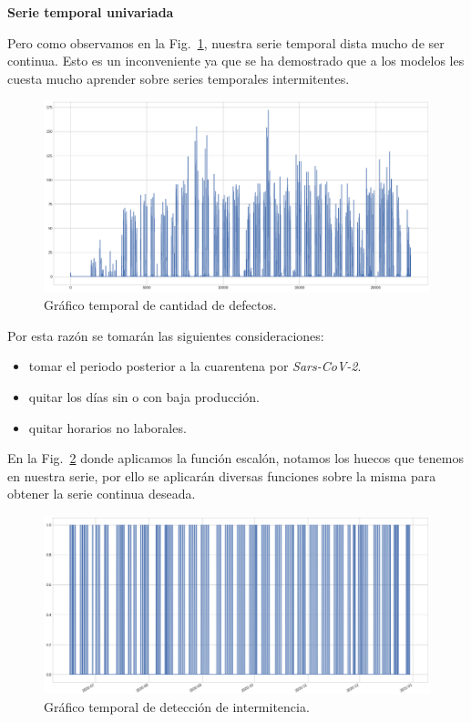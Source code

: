 \documentclass[a4paper,12pt]{article}
\begin{document}
		\hfill
		
		\textbf{Serie temporal univariada}
		
		Pero como observamos en la Fig.~\ref{fig:graf_cantdef_antes}, nuestra serie temporal dista mucho de ser continua. Esto es un inconveniente ya que se ha demostrado que a los modelos les cuesta mucho aprender sobre series temporales intermitentes.
		
		\begin{figure}[H]
			\begin{center}
				\includegraphics[width=1\textwidth]{tesis_78.png}
				\caption{Gráfico temporal de cantidad de defectos.}
				\label{fig:graf_cantdef_antes}
			\end{center}
		\end{figure}
		
		Por esta razón se tomarán las siguientes consideraciones:
		
		\begin{itemize}[noitemsep, topsep=2pt]
			\item tomar el periodo posterior a la cuarentena por \textit{Sars-CoV-2}.
			\item quitar los días sin o con baja producción.
			\item quitar horarios no laborales.
		\end{itemize}
		
		\clearpage
		
		En la Fig.~\ref{fig:graf_inter_antes} donde aplicamos la función escalón, notamos los huecos que tenemos en nuestra serie, por ello se aplicarán diversas funciones sobre la misma para obtener la serie continua deseada.
		
		\begin{figure}[H]
			\begin{center}
				\includegraphics[width=1\textwidth]{tesis_79.png}
				\caption{Gráfico temporal de detección de intermitencia.}
				\label{fig:graf_inter_antes}
			\end{center}
		\end{figure}
		
\end{document}

